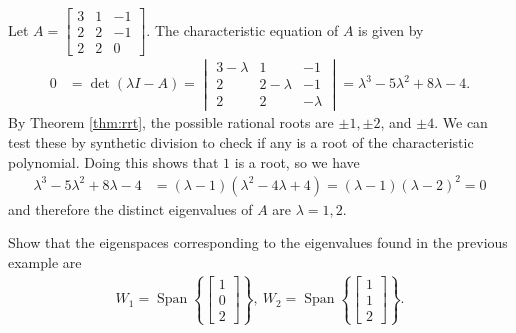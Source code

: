 \documentclass[12pt,letterpaper,reqno]{article}
\numberwithin{equation}{section}
\DeclareMathOperator{\Span}{Span}
\begin{document}
\begin{example}
Let $A=\begin{bmatrix}
	3 & 1 & -1 \\
	2 & 2 & -1 \\
	2 & 2 & 0
\end{bmatrix}$. The characteristic equation of $A$ is given by
\begin{align*}
	0&=\det(\lambda I-A)=\begin{vmatrix}
		3-\lambda & 1 & -1 \\
	2 & 2-\lambda & -1 \\
	2 & 2 & -\lambda
	\end{vmatrix}=\lambda^3-5\lambda^2+8\lambda-4.
\end{align*}	
By Theorem \ref{thm:rrt}, the possible rational roots are $\pm 1, \pm 2$, and $\pm 4$. We can test these by synthetic division to check if any is a root of the characteristic polynomial. Doing this shows that $1$ is a root, so we have 
\begin{align*}
	\lambda^3-5\lambda^2+8\lambda-4&=(\lambda-1)(\lambda^2-4\lambda+4)=(\lambda-1)(\lambda-2)^2=0
\end{align*}
and therefore the distinct eigenvalues of $A$ are $\lambda =1,2$.
\end{example}

\begin{exercise}
Show that the eigenspaces corresponding to the eigenvalues found in the previous example are 
\begin{align*}
	W_1=\Span \left\{\begin{bmatrix}
		1 \\ 0 \\ 2
	\end{bmatrix}\right\}, \ W_2=\Span \left\{\begin{bmatrix}
		1 \\ 1 \\ 2
	\end{bmatrix}\right\}.
\end{align*}	
\end{exercise}
\end{document}
